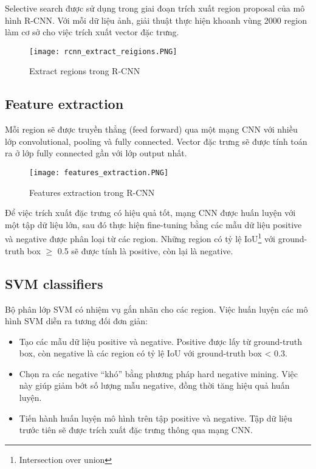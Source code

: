 \documentclass[../thesis.tex]{subfiles}
\begin{document}
Selective search được sử dụng trong giai đoạn trích xuất region proposal của mô hình R-CNN. Với mỗi dữ liệu ảnh, giải thuật thực hiện khoanh vùng 2000 region làm cơ sở cho việc trích xuất vector đặc trưng.

\begin{figure}[!htb]
	\centering
	\texttt{[image: rcnn\_extract\_reigions.PNG]}
	\caption{Extract regions trong R-CNN}\label{Fig:rcnn_extract_regions}
\end{figure}

\subsection{Feature extraction}

Mỗi region sẽ được truyền thẳng (feed forward) qua một mạng CNN với nhiều lớp convolutional, pooling và fully connected. Vector đặc trưng sẽ được tính toán ra ở lớp fully connected gần với lớp output nhất.

\begin{figure}[!htb]
	\centering
	\texttt{[image: features\_extraction.PNG]}
	\caption{Features extraction trong R-CNN}\label{Fig:rcnn_features_extraction}
\end{figure}

Để việc trích xuất đặc trưng có hiệu quả tốt, mạng CNN được huấn luyện với một tập dữ liệu lớn, sau đó thực hiện fine-tuning bằng các mẫu dữ liệu positive và negative được phân loại từ các region. Những region có tỷ lệ IoU\footnote{Intersection over union} với ground-truth box $\geq$ 0.5 sẽ được tính là positive, còn lại là negative.

\subsection{SVM classifiers}

Bộ phân lớp SVM có nhiệm vụ gắn nhãn cho các region. Việc huấn luyện các mô hình SVM diễn ra tương đối đơn giản:

\begin{itemize}
	\item Tạo các mẫu dữ liệu positive và negative. Positive được lấy từ ground-truth box, còn negative là các region có tỷ lệ IoU với ground-truth box < 0.3.
	\item Chọn ra các negative “khó” bằng phương pháp hard negative mining. Việc này giúp giảm bớt số lượng mẫu negative, đồng thời tăng hiệu quả huấn luyện.
	\item Tiến hành huấn luyện mô hình trên tập positive và negative. Tập dữ liệu trước tiên sẽ được trích xuất đặc trưng thông qua mạng CNN.
\end{itemize}
\end{document}
